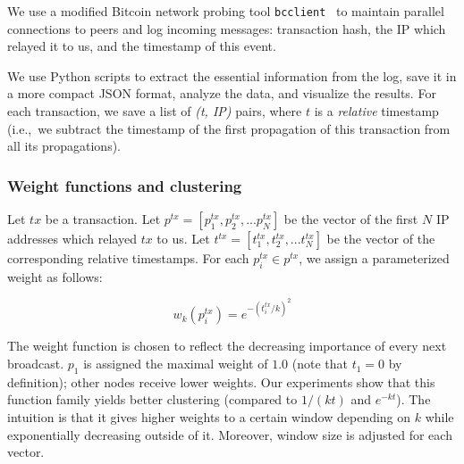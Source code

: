 We use a modified Bitcoin network probing tool \texttt{bcclient}~\cite{Pustogarov2017} to maintain parallel connections to peers and log incoming messages: transaction hash, the IP which relayed it to us, and the timestamp of this event.

\iffalse
To adapt \texttt{bcclient} for usage with Dash and Zcash, we change the relevant constants (port numbers, protocol magic bytes, DNS seeder addresses).
For Monero, which is not a Bitcoin fork, we modified the full node reference implementation (\texttt{monerod}), adding the required logging and disabling the built-in limits on the total bandwidth as well as artificial delays between network requests.

For the purposes of clustering, we only log \texttt{INV} messages, and never continue with the \texttt{GETDATA} -- \texttt{TX} exchange.
For some experiments, we also log \texttt{ADDR} messages to infer the set of most probable IP addresses corresponding to each cluster (only on the Bitcoin testnet).
For clarity, when describing our data analysis, we will refer to transaction inventory messages as "transactions".
\fi

We use Python scripts to extract the essential information from the log, save it in a more compact JSON format, analyze the data, and visualize the results.
For each transaction, we save a list of \textit{(t, IP)} pairs, where $t$ is a \textit{relative} timestamp (i.e.,~we subtract the timestamp of the first propagation of this transaction from all its propagations).

\subsubsection{Weight functions and clustering}

Let $tx$ be a transaction.
Let $p^{tx} = [p^{tx}_1, p^{tx}_2, ... p^{tx}_N]$ be the vector of the first $N$ IP addresses which relayed $tx$ to us.
Let $t^{tx} = [t^{tx}_1, t^{tx}_2, ... t^{tx}_N]$ be the vector of the corresponding relative timestamps.
For each $p^{tx}_i \in p^{tx}$, we assign a parameterized weight as follows:

\[
w_k(p^{tx}_i) = e^{-(t^{tx}_i/k)^2}
\]

The weight function is chosen to reflect the decreasing importance of every next broadcast.
$p_1$ is assigned the maximal weight of $1.0$ (note that $t_1=0$ by definition); other nodes receive lower weights.
Our experiments show that this function family yields better clustering (compared to $1/(kt)$ and $e^{-kt}$).
The intuition is that it gives higher weights to a certain window depending on $k$ while exponentially decreasing outside of it.
Moreover, window size is adjusted for each vector.

